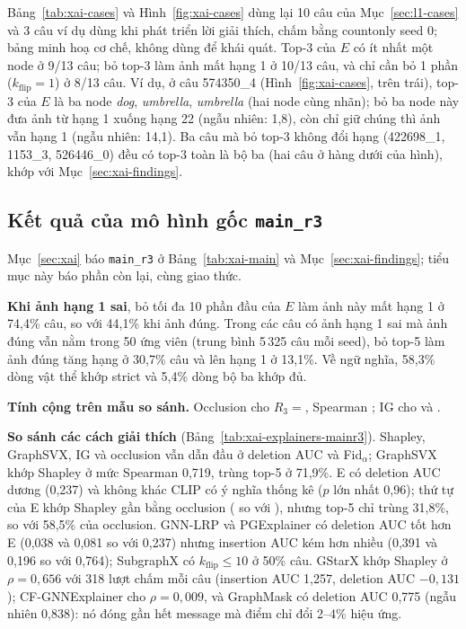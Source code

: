Bảng~\ref{tab:xai-cases} và Hình~\ref{fig:xai-cases} dùng lại 10 câu của Mục~\ref{sec:l1-cases} và 3 câu ví dụ dùng khi phát triển lời giải thích, chấm
bằng countonly seed 0; bảng minh hoạ cơ chế, không dùng để khái quát. Top-3 của $E$ có ít nhất một node ở 9/13 câu; bỏ top-3
làm ảnh mất hạng 1 ở 10/13 câu, và chỉ cần bỏ 1 phần ($k_{\text{flip}}=1$) ở 8/13 câu. Ví dụ, ở câu 574350\_4 (Hình~\ref{fig:xai-cases}, trên trái), top-3 của $E$
là ba node \emph{dog}, \emph{umbrella}, \emph{umbrella} (hai node cùng nhãn); bỏ ba node này đưa ảnh từ hạng 1 xuống hạng 22
(ngẫu nhiên: 1,8), còn chỉ giữ chúng thì ảnh vẫn hạng 1 (ngẫu nhiên: 14,1). Ba câu mà bỏ top-3 không đổi hạng (422698\_1,
1153\_3, 526446\_0) đều có top-3 toàn là bộ ba (hai câu ở hàng dưới của hình), khớp với Mục~\ref{sec:xai-findings}.

\subsection{Kết quả của mô hình gốc \texttt{main\_r3}}\label{sec:xai-mainr3}
Mục~\ref{sec:xai} báo \texttt{main\_r3} ở Bảng~\ref{tab:xai-main} và Mục~\ref{sec:xai-findings}; tiểu mục này báo phần còn
lại, cùng giao thức.

\textbf{Khi ảnh hạng 1 sai}, bỏ tối đa 10 phần đầu của $E$ làm ảnh này mất hạng 1 ở 74,4\% câu, so với 44,1\% khi ảnh
đúng. Trong các câu có ảnh hạng 1 sai mà ảnh đúng vẫn nằm trong 50 ứng viên (trung bình 5\,325 câu mỗi seed), bỏ top-5 làm
ảnh đúng tăng hạng ở 30,7\% câu và lên hạng 1 ở 13,1\%. Về ngữ nghĩa, 58,3\% dòng vật thể
khớp strict và 5,4\% dòng bộ ba khớp đủ.

\textbf{Tính cộng trên mẫu so sánh.} Occlusion cho $R_3={}$, Spearman ; IG cho
 và .

\textbf{So sánh các cách giải thích} (Bảng~\ref{tab:xai-explainers-mainr3}). Shapley, GraphSVX, IG và occlusion vẫn dẫn đầu ở
deletion AUC và Fid$_{\alpha}$; GraphSVX khớp Shapley ở mức Spearman 0,719, trùng top-5 ở 71,9\%. E có deletion AUC dương
(0,237) và không khác CLIP có ý nghĩa thống kê ($p$ lớn nhất 0,96); thứ tự của E khớp Shapley gần bằng occlusion
( so với ), nhưng top-5 chỉ trùng 31,8\%, so với 58,5\% của occlusion. GNN-LRP và
PGExplainer có deletion AUC tốt hơn E (0,038 và 0,081 so với 0,237) nhưng insertion AUC kém hơn nhiều (0,391 và 0,196 so với
0,764); SubgraphX có $k_{\text{flip}}\le 10$ ở 50\% câu. GStarX khớp Shapley ở $\rho=0{,}656$ với 318 lượt chấm mỗi câu
(insertion AUC 1,257, deletion AUC $-0{,}131$); CF-GNNExplainer cho $\rho=0{,}009$, và GraphMask có deletion AUC 0,775
(ngẫu nhiên 0,838): nó đóng gần hết message mà điểm chỉ đổi 2--4\% hiệu ứng.

